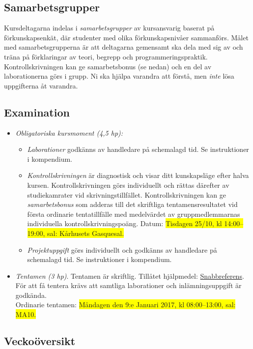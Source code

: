 \documentclass[a4paper,12pt,oneside]{memoir}
\newcommand{\TENTADATUM}{\colorbox{yellow}{Måndagen den 9:e Januari 2017, kl 08:00--13:00, sal: MA10.}}
\newcommand{\KSDATUM}{\colorbox{yellow}{Tisdagen 25/10, kl 14:00--19:00, sal: Kårhusets Gasquesal.}}
\begin{document}
\subsection{Samarbetsgrupper}\label{samarbetsgrupper}

Kursdeltagarna indelas i \emph{samarbetsgrupper} av kursansvarig baserat
på förkunskapsenkät, där studenter med olika förkunskapsnivåer
sammanförs. Målet med samarbetsgrupperna är att deltagarna gemensamt ska
dela med sig av och träna på förklaringar av teori, begrepp och
programmeringspraktik. Kontrollskrivningen kan ge samarbetsbonus (se
nedan) och en del av laborationerna görs i grupp. Ni ska hjälpa varandra att
förstå, men \emph{inte} lösa uppgifterna åt varandra.

\subsection{Examination}\label{examination}

\begin{itemize}
\item
  \emph{Obligatoriska kursmoment (4,5 hp):} 

  \begin{itemize}
  \item
    \emph{Laborationer} godkänns av handledare på schemalagd tid. Se
    instruktioner i kompendium.
  \item
    \emph{Kontrollskrivningen} är diagnostisk och visar ditt kunskapsläge efter
    halva kursen. Kontrollskrivningen görs individuellt och rättas
    därefter av studiekamrater vid skrivningstillfället.
    Kontrollskrivningen kan ge \emph{samarbetsbonus} som adderas till
    det skriftliga tentamensresultatet vid första ordinarie
    tentatillfälle med medelvärdet av gruppmedlemmarnas individuella
    kontrollskrivningspoäng. Datum: \KSDATUM
  \item
    \emph{Projektuppgift} görs individuellt och godkänns av handledare på
    schemalagd tid. Se instruktioner i kompendium.
  \end{itemize}

\item
  \emph{Tentamen (3 hp)}. Tentamen är skriftlig. Tillåtet hjälpmedel:
  \href{http://cs.lth.se/pgk/quickref}{Snabbreferens}. \\
  För att få tentera krävs att samtliga laborationer och inlämningsuppgift är godkända.\\
   Ordinarie tentamen: \TENTADATUM 
\end{itemize}

\clearpage

\subsection*{Veckoöversikt}

\resizebox{\columnwidth}{!}{%
{\fontsize{12pt}{24pt}\selectfont 

}
}
\end{document}
